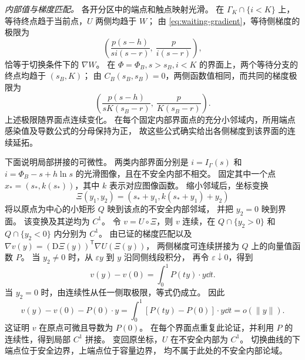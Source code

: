 \emph{内部值与梯度匹配。}
各开分区中的端点和触点映射光滑。
在 $\Gamma_K\cap\{i<K\}$ 上，等待终点趋于当前点，$U$ 两侧均趋于 $W$；
由 \eqref{eq:waiting-gradient}，等待侧梯度的极限为
\[
\left(\frac{p(s-h)}{si(s-r)},\ \frac{p}{i(s-r)}\right),
\]
恰等于切换条件下的 $\nabla W$。
在 $\Phi=\Phi_B,s>s_B,i<K$ 的界面上，两个等待分支的终点均趋于 $(s_B,K)$；
由 $C_B(s_B,s_B)=0$，两侧函数值相同，而共同的梯度极限为
\[
\left(\frac{p(s-h)}{sK(s_B-r)},\ \frac{p}{K(s_B-r)}\right).
\]
上述极限随界面点连续变化。
在每个固定内部界面点的充分小邻域内，所用端点感染值及导数公式的分母保持为正，
故这些公式确实给出各侧梯度到该界面的连续延拓。

下面说明局部拼接的可微性。
两类内部界面分别是 $i=I_\Gamma(s)$ 和
$i=\Phi_B-s+h\ln s$ 的光滑图像，且在不安全内部不相交。
固定其中一个点 $x_*=(s_*,k(s_*))$，其中 $k$ 表示对应图像函数。
缩小邻域后，坐标变换
\[
\Xi(y_1,y_2)=(s_*+y_1,k(s_*+y_1)+y_2)
\]
将以原点为中心的小矩形 $Q$ 映到该点的不安全内部邻域，
并把 $y_2=0$ 映到界面。
该变换及其逆均为 $C^1$。
令 $v=U\circ\Xi$，则 $v$ 连续，在 $Q\cap\{y_2>0\}$ 和
$Q\cap\{y_2<0\}$ 内分别为 $C^1$。
由已证的梯度匹配以及
$\nabla v(y)=(\mathrm D\Xi(y))^{\mathsf T}\nabla U(\Xi(y))$，
两侧梯度可连续拼接为 $Q$ 上的向量值函数 $P$。
当 $y_2\ne0$ 时，从 $\varepsilon y$ 到 $y$ 沿同侧线段积分，
再令 $\varepsilon\downarrow0$，得到
\[
v(y)-v(0)=\int_0^1 P(ty)\cdot y\dd t.
\]
当 $y_2=0$ 时，由连续性从任一侧取极限，等式仍成立。
因此
\[
v(y)-v(0)-P(0)\cdot y
=\int_0^1 [P(ty)-P(0)]\cdot y\dd t
=o(\lVert y\rVert).
\]
这证明 $v$ 在原点可微且导数为 $P(0)$。
在每个界面点重复此论证，并利用 $P$ 的连续性，得到局部 $C^1$ 拼接。
变回原坐标，$U$ 在不安全内部为 $C^1$。
切换曲线的下端点位于安全边界，上端点位于容量边界，
均不属于此处的不安全内部论域。

